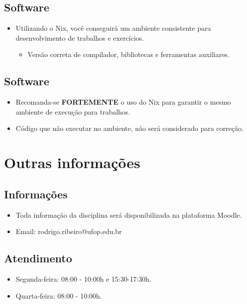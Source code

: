 \documentclass[11pt]{article}
\begin{document}
\subsection*{Software}
\label{sec:orgae3905a}

\begin{itemize}
\item Utilizando o Nix, você conseguirá um ambiente consistente para desenvolvimento de trabalhos e exercícios.
\begin{itemize}
\item Versão correta de compilador, bibliotecas e ferramentas auxiliares.
\end{itemize}
\end{itemize}
\subsection*{Software}
\label{sec:org4c8ce37}

\begin{itemize}
\item Recomanda-se \textbf{\textbf{FORTEMENTE}} o uso do Nix para garantir o mesmo ambiente de execução para trabalhos.

\item Código que não executar no ambiente, não será considerado para correção.
\end{itemize}
\section*{Outras informações}
\label{sec:org8819d68}

\subsection*{Informações}
\label{sec:orgcdc6e48}

\begin{itemize}
\item Toda informação da disciplina será disponibilizada na plataforma Moodle.

\item Email: rodrigo.ribeiro@ufop.edu.br
\end{itemize}
\subsection*{Atendimento}
\label{sec:org5c0b379}

\begin{itemize}
\item Segunda-feira: 08:00 - 10:00h e 15:30-17:30h.
\item Quarta-feira: 08:00 - 10:00h.
\end{itemize}
\end{document}

